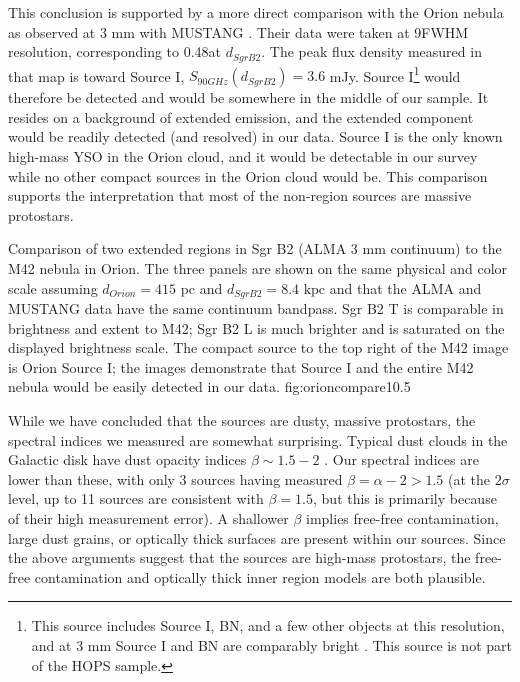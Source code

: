 \documentclass[twocolumn]{aastex61}
\newcommand{\dsgrb}{\ensuremath{8.4\textrm{~kpc}}\xspace}
\begin{document}
This conclusion is supported by a more direct comparison with the Orion nebula
as observed at 3 mm with MUSTANG \citep[][Figure
\ref{fig:orioncompare}]{Dicker2009a}.  Their data were taken at
9\arcsec FWHM resolution, corresponding to 0.48\arcsec at $d_{Sgr B2}$.  The
peak flux density measured in that map is toward Source I, $S_{90 GHz}(d_{Sgr
B2}) = 3.6$ mJy.  Source I\footnote{This source includes Source I, BN, and a few
other objects at this resolution, and at 3 mm Source I and BN are comparably
bright \citep{Plambeck2013a}.  This source is not part of the HOPS sample.}
would therefore  be detected and would be
somewhere in the middle of our sample.  It resides on a background of
extended emission, and the
extended component would be readily detected (and resolved) in our data. 
Source I is the only known high-mass YSO in the Orion cloud, and it would
be detectable in our survey while no other compact sources in the Orion cloud
would be.  This comparison supports the interpretation that most of the
non-\hii region sources are massive protostars.


{Comparison of two extended \hii regions in Sgr B2 (ALMA 3 mm continuum) to the
M42 \citep[GBT MUSTANG 3 mm continuum;][]{Dicker2009a} nebula in Orion.
The three panels are shown on the same physical and color scale assuming
$d_{Orion} = 415$ pc and $d_{Sgr B2} = $\dsgrb and that the ALMA and MUSTANG
data have the same continuum bandpass.  Sgr B2 \hii T is comparable in
brightness and extent to M42; Sgr B2 \hii L is much brighter and is saturated
on the displayed brightness scale.  The compact source to the top right of the
M42 image is Orion Source I; the images demonstrate that Source I and the entire
M42 nebula would be easily detected in our data.
}
{fig:orioncompare}{1}{0.5\textwidth}

While we have concluded that the sources are dusty, massive protostars, the
spectral indices we measured are somewhat surprising.  Typical dust clouds in
the Galactic disk have dust opacity indices $\beta\sim1.5-2$
\citep{Schnee2010a,Shirley2011a,Sadavoy2016a}.  Our spectral indices are lower
than these, with only 3 sources having measured $\beta=\alpha-2 > 1.5$ (at the
$2\sigma$ level, up to 11 sources are consistent with $\beta=1.5$, but this is
primarily because of their high measurement error).  A shallower $\beta$
implies free-free contamination, large dust grains, or optically thick surfaces
are present within our sources.  Since the above arguments suggest that the
sources are high-mass protostars, the free-free contamination and optically
thick inner region models are both plausible.
\end{document}
